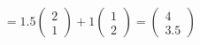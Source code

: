 \documentclass[preview]{standalone}
\begin{document}
\begin{align*}
= 1.5 \begin{pmatrix} 2 \\ 1 \end{pmatrix} + 1 \begin{pmatrix} 1 \\ 2 \end{pmatrix} = \begin{pmatrix} 4 \\ 3.5 \end{pmatrix}
\end{align*}
\end{document}
